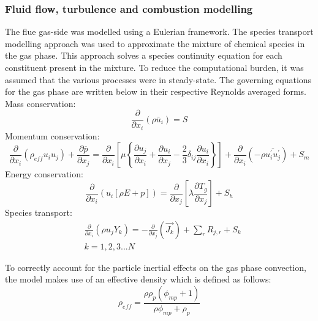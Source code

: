 \documentclass[11pt,cleanfoot]{asme2ej}
\begin{document}
\subsubsection{Fluid flow, turbulence and combustion modelling}
The flue gas-side was modelled using a Eulerian framework. The species transport modelling approach was used to approximate the mixture of chemical species in the gas phase. This approach solves a species continuity equation for each constituent present in the mixture. To reduce the computational burden, it was assumed that the various processes were in steady-state. The governing equations for the gas phase are written below in their respective Reynolds averaged forms.\\
Mass conservation:
\begin{equation}\label{eqn_RANS_mass}
\frac{\partial}{\partial x_{i}}(\rho \bar{u}_{i})=S
\end{equation}
Momentum conservation:
\begin{equation}\label{eqn_momentum}
\frac{\partial}{\partial x_{i}}(\rho_{eff} u_{i}u_{j})+\frac{\partial \overline{p}}{\partial x_{j}}=\frac{\partial}{\partial x_{i}}\left[\mu\left\{\frac{\partial u_{j}}{\partial x_{i}}+\frac{\partial u_{i}}{\partial x_{j}}-\frac{2}{3}\delta_{ij}\frac{\partial u_{i}}{\partial x_{i}}\right\}\right]+\frac{\partial}{\partial x_{i}}(-\rho\overline{u_{i}^{'}u_{j}^{'}})+S_m
\end{equation}
Energy conservation:
\begin{equation}\label{eqn_energy}
\frac{\partial }{\partial x_{i}} (u_{i}[\rho E+p])=\frac{\partial }{\partial x_{j}}\left[\lambda\frac{\partial T_{g}}{\partial x_{j}}\right] +S_{h}
\end{equation}
Species transport:
\begin{equation}\label{eqn_species}
\begin{split}
&\frac{\partial}{\partial x_{i}}(\rho u_{j}Y_{k})=-\frac{\partial}{\partial x_{j}}(\vec{J_{k}})+ \sum_r R_{j,r} + S_{k}\\
&k = 1,2,3...N
\end{split}
\end{equation}

To correctly account for the particle inertial effects on the gas phase convection, the model makes use of an effective density which is defined as follows:
\begin{equation} \label{eqn_eff_rho}
	\rho_{eff} = \frac{\rho \rho_p \left( \phi_{mp} + 1 \right)}{\rho \phi_{mp} + \rho_p}
\end{equation}
\end{document}
